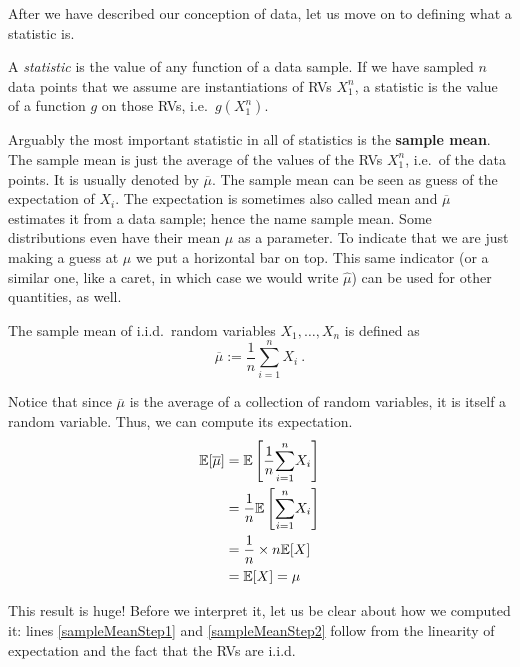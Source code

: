 After we have described our conception of data, let us move on to defining what a statistic is.

\begin{Definition}
A \emph{statistic} is the value of any function of a data sample. If we have sampled $ n $ data points that we assume are instantiations of RVs
$ X_{1}^{n} $, a statistic is the value of a function $ g $ on those RVs, i.e.\ $ g(X_{1}^{n}) $.
\end{Definition}

Arguably the most important statistic in all of statistics is the \textbf{sample mean}. The sample mean is just the average of the
values of the RVs $ X_{1}^{n} $, i.e.\ of the data points. It is usually denoted by $ \overline{\mu} $. The
sample mean can be seen as guess of the expectation of $ X_{i} $. The expectation is sometimes also
called mean and $ \overline{\mu} $ estimates it from a data sample; hence the name sample mean. Some distributions even have their
mean $ \mu $ as a parameter. To indicate that we are just making a guess at $ \mu $ we put a horizontal bar on top.
This same indicator (or a similar one, like a caret, in which case we would write $ \hat{\mu} $) can be used for other quantities, as well.

\begin{Definition}
The sample mean of i.i.d.\ random variables $ X_{1}, \ldots, X_{n} $ is defined as 
$$ \overline{\mu} := \dfrac{1}{n}\underset{i=1}{\overset{n}{\sum}} X_{i} \ . $$
\end{Definition}

Notice that since $ \overline{\mu} $ is the average of a collection of random variables, it is itself a random variable. Thus, we can
compute its expectation.
\begin{align}
\mathbb{E}[\overline{\mu}] &= \mathbb{E}\left[\dfrac{1}{n} \underset{i=1}{\overset{n}{\sum}} X_{i}\right] \label{eq:sampleMeanBegin} \\
&= \dfrac{1}{n} \mathbb{E}\left[\underset{i=1}{\overset{n}{\sum}} X_{i}\right] \label{sampleMeanStep1} \\
&= \dfrac{1}{n} \times n \mathbb{E}[X] \label{sampleMeanStep2} \\
&= \mathbb{E}[X] = \mu \label{eq:sampleMeanEnd}
\end{align}

This result is huge! Before we interpret it, let us be clear about how we computed it: lines \eqref{sampleMeanStep1} and
\eqref{sampleMeanStep2} follow from the linearity of expectation and the fact that the RVs are i.i.d. 

